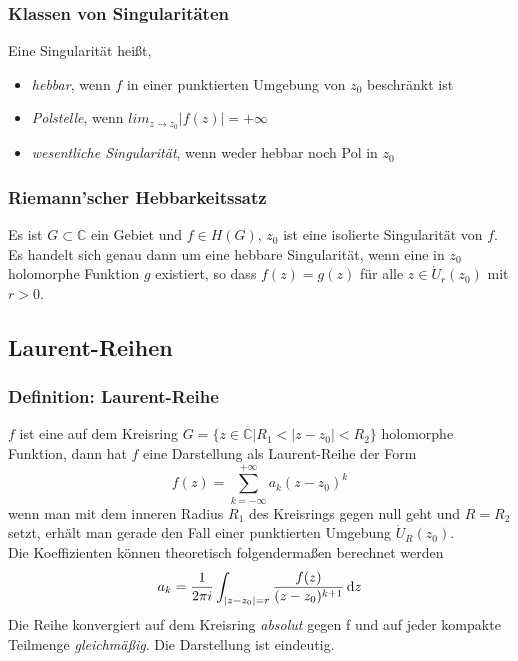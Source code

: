 \subsubsection{Klassen von Singularitäten}
Eine Singularität heißt,
\begin{itemize}
    \item \textit{hebbar}, wenn $f$ in einer punktierten Umgebung von $z_0$ beschränkt ist
    \item \textit{Polstelle}, wenn $lim_{z\to z_0}|f(z)|=+\infty$
    \item \textit{wesentliche Singularität}, wenn weder hebbar noch Pol in $z_0$
\end{itemize}

\subsubsection{Riemann'scher Hebbarkeitssatz}
Es ist $G\subset\mathbb{C}$ ein Gebiet und $f\in H(G)$, $z_0$ ist eine isolierte Singularität von $f$. Es handelt sich genau dann um eine hebbare Singularität, wenn eine in $z_0$ holomorphe Funktion $g$ existiert, so dass $f(z) = g(z)$ für alle $z\in \dot{U}_r(z_0)$ mit $r>0$.

\subsection{Laurent-Reihen}
\subsubsection{Definition: Laurent-Reihe}
$f$ ist eine auf dem Kreisring  $G=\{z\in\mathbb{C} | R_1 < |z-z_0| < R_2\}$ holomorphe Funktion, dann hat $f$ eine Darstellung als Laurent-Reihe der Form
\begin{equation*}
    f(z)=\sum_{k=-\infty}^{+\infty}a_k(z-z_0)^k
\end{equation*}
wenn man mit dem inneren Radius $R_1$ des Kreisrings gegen null geht und $R=R_2$ setzt, erhält man gerade den Fall einer punktierten Umgebung $\dot{U}_R(z_0)$.\\
Die Koeffizienten können theoretisch folgendermaßen berechnet werden
\begin{equation*}
    a_k=\frac{1}{2\pi i }\int_{|z-z_0|=r}\frac{f(z)}{(z-z_0)^{k+1}}\mathop{}\!\mathrm{d} z
\end{equation*}
Die Reihe konvergiert auf dem Kreisring \textit{absolut} gegen f und auf jeder kompakte Teilmenge \textit{gleichmäßig}. Die Darstellung ist eindeutig.

